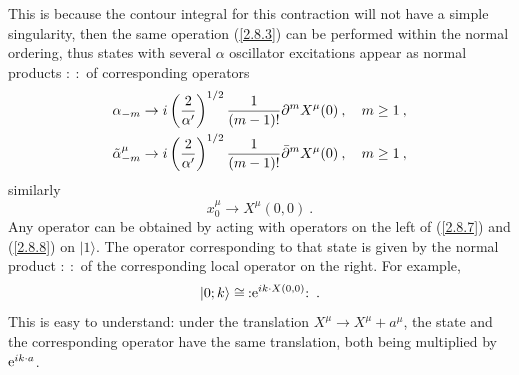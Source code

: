 This is because the contour integral for this contraction will not have a simple singularity, then the same operation (\ref{2.8.3}) can be performed within the normal ordering, thus states with several $\alpha$ oscillator excitations appear as normal products $\mathrel{:\::}$ of corresponding operators    
\begin{subequations}\label{2.8.7}
	\begin{align}
		\alpha_{-m} &\rightarrow i\left(\frac{2}{\alpha^{\prime}}\right)^{1 / 2} \frac{1}{(m-1) !} \partial^{m} X^{\mu}(0)\:, \quad m \geq 1 \:,  \\
		\tilde{\alpha}_{-m}^{\mu} &\rightarrow i\left(\frac{2}{\alpha^{\prime}}\right)^{1 / 2} \frac{1}{(m-1) !} \bar{\partial}^{m} X^{\mu}(0)\:, \quad m \geq 1 \:,
	\end{align}
\end{subequations}
similarly    
\begin{equation}\label{2.8.8}
	x_{0}^{\mu} \rightarrow X^{\mu}(0,0) \:.
\end{equation}
Any operator can be obtained by acting with operators on the left of (\ref{2.8.7}) and (\ref{2.8.8}) on $|1\rangle$. 
The operator corresponding to that state is given by the normal product $\mathrel{:\::}$ of the corresponding local operator on the right. For example,    
\begin{equation}
	\lvert 0 ; k\rangle \cong \: : \mathrel{\mathrm{e}^{i k \cdot X(0,0)}}: \:.
	\label{2.8.9}
\end{equation}
This is easy to understand: under the translation $X^{\mu} \rightarrow X^{\mu}+a^{\mu}$, the state and the corresponding operator have the same translation, both being multiplied by $\mathrm{e} ^{i k\cdot a}$.     
